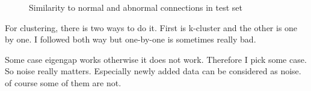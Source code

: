 \begin{figure}[htb2]
\begin{center}
\end{center}
\caption{Similarity to normal and abnormal connections in test set} %
\label{fig:refSingleRobot1}
\end{figure}

For clustering, there is two ways to do it.
First is k-cluster and the other is one by one. I followed both way but one-by-one is sometimes really bad.

Some case eigengap works otherwise it does not work. Therefore I pick some case.
So noise really matters. Especially newly added data can be considered as noise. of course some of them are not.
